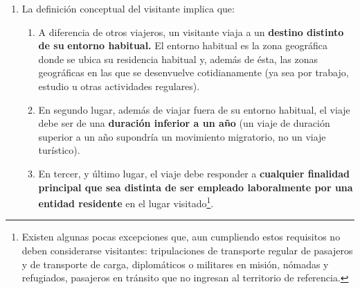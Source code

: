 \documentclass[
]{book}
\begin{document}
\begin{enumerate}
\def\labelenumi{\arabic{enumi}.}
\item
  La definición conceptual del visitante implica que:

  \begin{enumerate}
  \def\labelenumii{\arabic{enumii}.}
  \item
    A diferencia de otros viajeros, un visitante viaja a un \textbf{destino distinto de su} \textbf{entorno habitual.} El entorno habitual es la zona geográfica donde se ubica su residencia habitual y, además de ésta, las zonas geográficas en las que se desenvuelve cotidianamente (ya sea por trabajo, estudio u otras actividades regulares).
  \item
    En segundo lugar, además de viajar fuera de su entorno habitual, el viaje debe ser de una \textbf{duración inferior a un año} (un viaje de duración superior a un año supondría un movimiento migratorio, no un viaje turístico).
  \item
    En tercer, y último lugar, el viaje debe responder a \textbf{cualquier finalidad principal que sea distinta de ser empleado laboralmente por una entidad residente} en el lugar visitado\footnote{Existen algunas pocas excepciones que, aun cumpliendo estos requisitos no deben considerarse visitantes: tripulaciones de transporte regular de pasajeros y de transporte de carga, diplomáticos o militares en misión, nómadas y refugiados, pasajeros en tránsito que no ingresan al territorio de referencia.}.
  \end{enumerate}
\end{enumerate}
\end{document}
